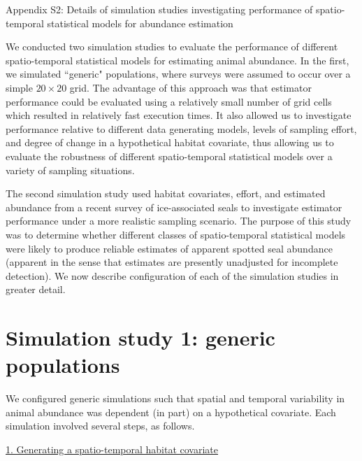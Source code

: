 \documentclass[12pt,fleqn]{article}
\begin{document}
\rm \begin{flushleft}

\raggedbottom
\vspace{.5in}


\begin{center}
Appendix S2: Details of simulation studies investigating performance of spatio-temporal statistical models for abundance estimation
\bigskip
\end{center}

\doublespacing
We conducted two simulation studies to evaluate the performance of different spatio-temporal statistical models for estimating animal abundance.  In the first, we simulated ``generic" populations, where surveys were assumed to occur over a simple $20 \times 20$ grid.  The advantage of this approach was that estimator performance could be evaluated using a relatively small number of grid cells which resulted in relatively fast execution times.  It also allowed us to investigate performance relative to different data generating models, levels of sampling effort, and degree of change in a hypothetical habitat covariate, thus allowing us to evaluate the robustness of different spatio-temporal statistical models over a variety of sampling situations.

\hspace{.5in} The second simulation study used habitat covariates, effort, and estimated abundance from a recent survey of ice-associated seals \citep[see e.g.][]{ConnEtAl2014} to investigate estimator performance under a more realistic sampling scenario.  The purpose of this study was to determine whether different classes of spatio-temporal statistical models were likely to produce reliable estimates of apparent spotted seal abundance (apparent in the sense that estimates are presently unadjusted for incomplete detection).  We now describe configuration of each of the simulation studies in greater detail.

\section{Simulation study 1: generic populations}

We configured generic simulations such that spatial and temporal variability in animal abundance was dependent (in part) on a hypothetical covariate.  Each simulation involved several steps, as follows.

\underline{1. Generating a spatio-temporal habitat covariate}


\end{flushleft}
\end{document}
